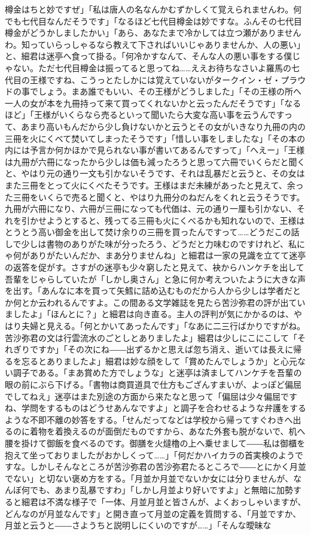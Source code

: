 \documentclass[12pt, openright]{book}
\begin{document}
樽金はちと妙ですぜ」「私は唐人の名なんかむずかしくて覚えられませんわ。何でも七代目なんだそうです」「なるほど七代目樽金は妙ですな。ふんその七代目樽金がどうかしましたかい」「あら、あなたまで冷かしては立つ瀬がありませんわ。知っていらっしゃるなら教えて下さればいいじゃありませんか、人の悪い」と、細君は迷亭へ食って掛る。「何冷かすなんて、そんな人の悪い事をする僕じゃない。ただ七代目樽金は振ってると思ってね\ldots{}\ldots{}ええお待ちなさいよ羅馬の七代目の王様ですね、こうっとたしかには覚えていないがタークイン・ゼ・プラウドの事でしょう。まあ誰でもいい、その王様がどうしました」「その王様の所へ一人の女が本を九冊持って来て買ってくれないかと云ったんだそうです」「なるほど」「王様がいくらなら売るといって聞いたら大変な高い事を云うんですって、あまり高いもんだから少し負けないかと云うとその女がいきなり九冊の内の三冊を火にくべて焚いてしまったそうです」「惜しい事をしましたな」「その本の内には予言か何かほかで見られない事が書いてあるんですって」「へえー」「王様は九冊が六冊になったから少しは価も減ったろうと思って六冊でいくらだと聞くと、やはり元の通り一文も引かないそうです、それは乱暴だと云うと、その女はまた三冊をとって火にくべたそうです。王様はまだ未練があったと見えて、余った三冊をいくらで売ると聞くと、やはり九冊分のねだんをくれと云うそうです。九冊が六冊になり、六冊が三冊になっても代価は、元の通り一厘も引かない、それを引かせようとすると、残ってる三冊も火にくべるかも知れないので、王様はとうとう高い御金を出して焚け余りの三冊を買ったんですって\ldots{}\ldots{}どうだこの話しで少しは書物のありがた味が分ったろう、どうだと力味むのですけれど、私にゃ何がありがたいんだか、まあ分りませんね」と細君は一家の見識を立てて迷亭の返答を促がす。さすがの迷亭も少々窮したと見えて、袂からハンケチを出して吾輩をじゃらしていたが「しかし奥さん」と急に何か考えついたように大きな声を出す。「あんなに本を買って矢鱈に詰め込むものだから人から少しは学者だとか何とか云われるんですよ。この間ある文学雑誌を見たら苦沙弥君の評が出ていましたよ」「ほんとに？」と細君は向き直る。主人の評判が気にかかるのは、やはり夫婦と見える。「何とかいてあったんです」「なあに二三行ばかりですがね。苦沙弥君の文は行雲流水のごとしとありましたよ」細君は少しにこにこして「それぎりですか」「その次にね――出ずるかと思えば忽ち消え、逝いては長えに帰るを忘るとありましたよ」細君は妙な顔をして「賞めたんでしょうか」と心元ない調子である。「まあ賞めた方でしょうな」と迷亭は済ましてハンケチを吾輩の眼の前にぶら下げる。「書物は商買道具で仕方もござんすまいが、よっぽど偏屈でしてねえ」迷亭はまた別途の方面から来たなと思って「偏屈は少々偏屈ですね、学問をするものはどうせあんなですよ」と調子を合わせるような弁護をするような不即不離の妙答をする。「せんだってなどは学校から帰ってすぐわきへ出るのに着物を着換えるのが面倒だものですから、あなた外套も脱がないで、机へ腰を掛けて御飯を食べるのです。御膳を火燵櫓の上へ乗せまして――私は御櫃を抱えて坐っておりましたがおかしくって\ldots{}\ldots{}」「何だかハイカラの首実検のようですな。しかしそんなところが苦沙弥君の苦沙弥君たるところで――とにかく月並でない」と切ない褒め方をする。「月並か月並でないか女には分りませんが、なんぼ何でも、あまり乱暴ですわ」「しかし月並より好いですよ」と無暗に加勢すると細君は不満な様子で「一体、月並月並と皆さんが、よくおっしゃいますが、どんなのが月並なんです」と開き直って月並の定義を質問する、「月並ですか、月並と云うと――さようちと説明しにくいのですが\ldots{}\ldots{}」「そんな曖昧な
\end{document}
